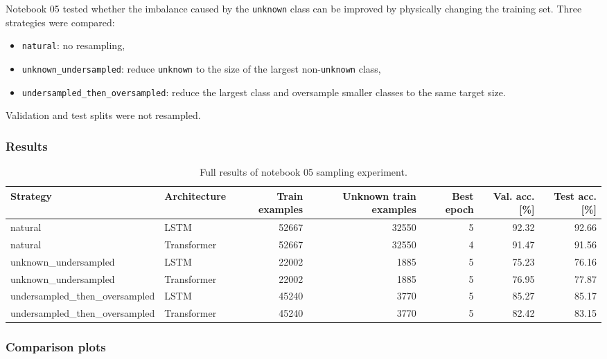 \documentclass[14pt]{article}
\begin{document}
Notebook 05 tested whether the imbalance caused by the \texttt{unknown} class can be improved by physically changing the training set. Three strategies were compared:

\begin{itemize}
    \item \texttt{natural}: no resampling,
    \item \texttt{unknown\_undersampled}: reduce \texttt{unknown} to the size of the largest non-\texttt{unknown} class,
    \item \texttt{undersampled\_then\_oversampled}: reduce the largest class and oversample smaller classes to the same target size.
\end{itemize}

Validation and test splits were not resampled.

\subsubsection{Results}

\begin{table}[H]
\centering
\caption{Full results of notebook 05 sampling experiment.}
\label{tab:sampling-results}
\begin{adjustbox}{width=\linewidth}
\begin{tabular}{llrrrrr}
\toprule
Strategy & Architecture & Train examples & Unknown train examples & Best epoch & Val. acc. [\%] & Test acc. [\%] \\
\midrule
natural & LSTM & 52667 & 32550 & 5 & 92.32 & 92.66 \\
natural & Transformer & 52667 & 32550 & 4 & 91.47 & 91.56 \\
unknown\_undersampled & LSTM & 22002 & 1885 & 5 & 75.23 & 76.16 \\
unknown\_undersampled & Transformer & 22002 & 1885 & 5 & 76.95 & 77.87 \\
undersampled\_then\_oversampled & LSTM & 45240 & 3770 & 5 & 85.27 & 85.17 \\
undersampled\_then\_oversampled & Transformer & 45240 & 3770 & 5 & 82.42 & 83.15 \\
\bottomrule
\end{tabular}
\end{adjustbox}
\end{table}

\subsubsection{Comparison plots}
\end{document}
